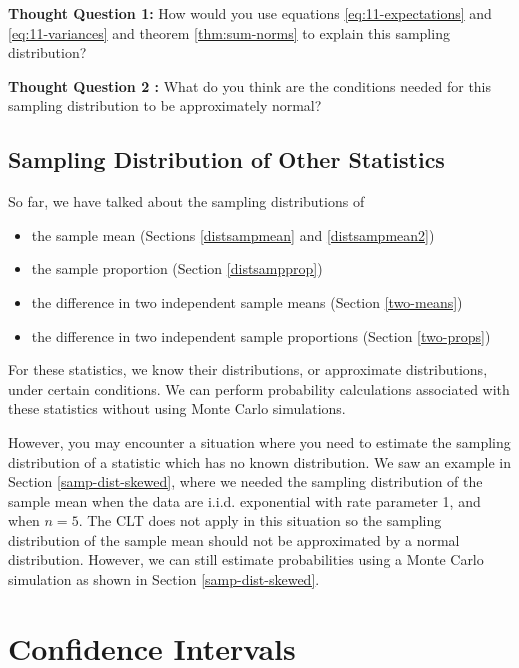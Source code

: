 \documentclass[
]{book}
\providecommand{\tightlist}{%
  \setlength{\itemsep}{0pt}\setlength{\parskip}{0pt}}
\theoremstyle{definition}
\theoremstyle{definition}
\theoremstyle{definition}
\theoremstyle{definition}
\theoremstyle{remark}
\begin{document}
\textbf{Thought Question 1:} How would you use equations \eqref{eq:11-expectations} and \eqref{eq:11-variances} and theorem \ref{thm:sum-norms} to explain this sampling distribution?

\textbf{Thought Question 2 :} What do you think are the conditions needed for this sampling distribution to be approximately normal?

\hypertarget{sampling-distribution-of-other-statistics}{%
\section{Sampling Distribution of Other Statistics}\label{sampling-distribution-of-other-statistics}}

So far, we have talked about the sampling distributions of

\begin{itemize}
\tightlist
\item
  the sample mean (Sections \ref{distsampmean} and \ref{distsampmean2})
\item
  the sample proportion (Section \ref{distsampprop})
\item
  the difference in two independent sample means (Section \ref{two-means})
\item
  the difference in two independent sample proportions (Section \ref{two-props})
\end{itemize}

For these statistics, we know their distributions, or approximate distributions, under certain conditions. We can perform probability calculations associated with these statistics without using Monte Carlo simulations.

However, you may encounter a situation where you need to estimate the sampling distribution of a statistic which has no known distribution. We saw an example in Section \ref{samp-dist-skewed}, where we needed the sampling distribution of the sample mean when the data are i.i.d. exponential with rate parameter 1, and when \(n=5\). The CLT does not apply in this situation so the sampling distribution of the sample mean should not be approximated by a normal distribution. However, we can still estimate probabilities using a Monte Carlo simulation as shown in Section \ref{samp-dist-skewed}.

\hypertarget{CI}{%
\chapter{Confidence Intervals}\label{CI}}
\end{document}
